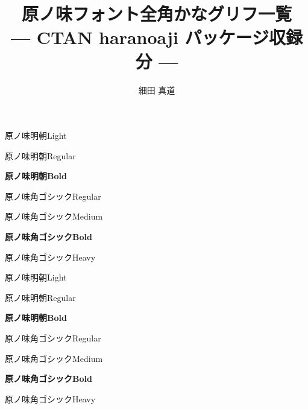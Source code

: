 \documentclass[dvipdfmx]{jsarticle}
\title{原ノ味フォント全角かなグリフ一覧\\
--- CTAN haranoaji パッケージ収録分 ---}
\author{細田 真道}
\begin{document}
\maketitle


\clearpage
\parindent=0pt
\fboxsep=0pt

\mcfamily\ltseries
{\huge 原ノ味明朝\textmd{Light}}

\testAllH

\clearpage

\mcfamily\mdseries
{\huge 原ノ味明朝\textmd{Regular}}

\testAllH

\clearpage

\mcfamily\bfseries
{\huge 原ノ味明朝\textmd{Bold}}

\testAllH

\clearpage

\gtfamily\mdseries
{\huge 原ノ味角ゴシック\textmd{Regular}}

\testAllH

\clearpage

\mgfamily %
{\huge 原ノ味角ゴシック\textmd{Medium}}

\testAllH

\clearpage

\gtfamily\bfseries
{\huge 原ノ味角ゴシック\textmd{Bold}}

\testAllH

\clearpage

\gtfamily\ebseries
{\huge 原ノ味角ゴシック\textmd{Heavy}}

\testAllH

\clearpage

\mcfamily\ltseries
{\huge 原ノ味明朝\textmd{Light}}

\testAllV

\clearpage

\mcfamily\mdseries
{\huge 原ノ味明朝\textmd{Regular}}

\testAllV

\clearpage

\mcfamily\bfseries
{\huge 原ノ味明朝\textmd{Bold}}

\testAllV

\clearpage

\gtfamily\mdseries
{\huge 原ノ味角ゴシック\textmd{Regular}}

\testAllV

\clearpage

\mgfamily %
{\huge 原ノ味角ゴシック\textmd{Medium}}

\testAllV

\clearpage

\gtfamily\bfseries
{\huge 原ノ味角ゴシック\textmd{Bold}}

\testAllV

\clearpage

\gtfamily\ebseries
{\huge 原ノ味角ゴシック\textmd{Heavy}}

\testAllV
\end{document}
